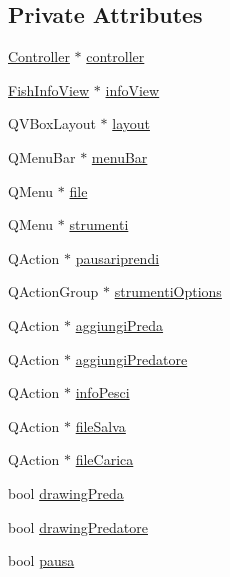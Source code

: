 \subsection*{Private Attributes}
\begin{DoxyCompactItemize}
\item 
\hyperlink{classController}{Controller} $\ast$ \hyperlink{classAcquarioView_a894c6c7ad89ce30db47c7c7ba37f6469_a894c6c7ad89ce30db47c7c7ba37f6469}{controller}
\item 
\hyperlink{classFishInfoView}{Fish\+Info\+View} $\ast$ \hyperlink{classAcquarioView_a7f0e96bf4bf69b1bb9c6bd6ef364145c_a7f0e96bf4bf69b1bb9c6bd6ef364145c}{info\+View}
\item 
Q\+V\+Box\+Layout $\ast$ \hyperlink{classAcquarioView_acbb6fc02e53b4b158643ee72fd1b1a43_acbb6fc02e53b4b158643ee72fd1b1a43}{layout}
\item 
Q\+Menu\+Bar $\ast$ \hyperlink{classAcquarioView_ac6a3b6a8febb40759c2bc3555995e46d_ac6a3b6a8febb40759c2bc3555995e46d}{menu\+Bar}
\item 
Q\+Menu $\ast$ \hyperlink{classAcquarioView_a794d97486873aa3cc187bed6aff3b1af_a794d97486873aa3cc187bed6aff3b1af}{file}
\item 
Q\+Menu $\ast$ \hyperlink{classAcquarioView_af3886eb0647eaaff7412fec6ba751d9c_af3886eb0647eaaff7412fec6ba751d9c}{strumenti}
\item 
Q\+Action $\ast$ \hyperlink{classAcquarioView_aa22b52c8af90c99a62fce96db94923dc_aa22b52c8af90c99a62fce96db94923dc}{pausariprendi}
\item 
Q\+Action\+Group $\ast$ \hyperlink{classAcquarioView_a254259de7a6667b127571170f362506f_a254259de7a6667b127571170f362506f}{strumenti\+Options}
\item 
Q\+Action $\ast$ \hyperlink{classAcquarioView_a0fc099b6a1ffefac21078ae1ff2c506c_a0fc099b6a1ffefac21078ae1ff2c506c}{aggiungi\+Preda}
\item 
Q\+Action $\ast$ \hyperlink{classAcquarioView_aaedc3e272850487836d7d3f2eca5f871_aaedc3e272850487836d7d3f2eca5f871}{aggiungi\+Predatore}
\item 
Q\+Action $\ast$ \hyperlink{classAcquarioView_a5e7f261dac213f74670d0e5345049045_a5e7f261dac213f74670d0e5345049045}{info\+Pesci}
\item 
Q\+Action $\ast$ \hyperlink{classAcquarioView_aa63343f4d1c27494bbe047211e315155_aa63343f4d1c27494bbe047211e315155}{file\+Salva}
\item 
Q\+Action $\ast$ \hyperlink{classAcquarioView_a91736ae2873ab1e8de4a792b832cef16_a91736ae2873ab1e8de4a792b832cef16}{file\+Carica}
\item 
bool \hyperlink{classAcquarioView_a24e948237068ccc38d460321e773664c_a24e948237068ccc38d460321e773664c}{drawing\+Preda}
\item 
bool \hyperlink{classAcquarioView_acf303ad47051a2c4ecc255c22b949807_acf303ad47051a2c4ecc255c22b949807}{drawing\+Predatore}
\item 
bool \hyperlink{classAcquarioView_a055ea31340de5ba6a555840010d7ffbc_a055ea31340de5ba6a555840010d7ffbc}{pausa}
\end{DoxyCompactItemize}


